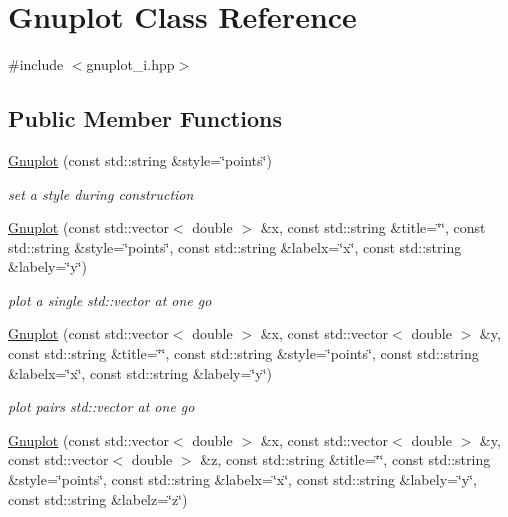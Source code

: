 \hypertarget{classGnuplot}{\section{\-Gnuplot \-Class \-Reference}
\label{classGnuplot}
}


{\ttfamily \#include $<$gnuplot\-\_\-i.\-hpp$>$}

\subsection*{\-Public \-Member \-Functions}
\begin{DoxyCompactItemize}
\item 
\hyperlink{classGnuplot_a187eb517b362cf379492fe7f1621ee50}{\-Gnuplot} (const std\-::string \&style=\char`\"{}points\char`\"{})
\begin{DoxyCompactList}\small\item\em set a style during construction \end{DoxyCompactList}\item 
\hyperlink{classGnuplot_a8ceac5808e42665c1dee305ae7ea9070}{\-Gnuplot} (const std\-::vector$<$ double $>$ \&x, const std\-::string \&title=\char`\"{}\char`\"{}, const std\-::string \&style=\char`\"{}points\char`\"{}, const std\-::string \&labelx=\char`\"{}x\char`\"{}, const std\-::string \&labely=\char`\"{}y\char`\"{})
\begin{DoxyCompactList}\small\item\em plot a single std\-::vector at one go \end{DoxyCompactList}\item 
\hyperlink{classGnuplot_a24327b6116c71acdc195eadf665c67cb}{\-Gnuplot} (const std\-::vector$<$ double $>$ \&x, const std\-::vector$<$ double $>$ \&y, const std\-::string \&title=\char`\"{}\char`\"{}, const std\-::string \&style=\char`\"{}points\char`\"{}, const std\-::string \&labelx=\char`\"{}x\char`\"{}, const std\-::string \&labely=\char`\"{}y\char`\"{})
\begin{DoxyCompactList}\small\item\em plot pairs std\-::vector at one go \end{DoxyCompactList}\item 
\hyperlink{classGnuplot_a14191e89154f2716608f6907975cc012}{\-Gnuplot} (const std\-::vector$<$ double $>$ \&x, const std\-::vector$<$ double $>$ \&y, const std\-::vector$<$ double $>$ \&z, const std\-::string \&title=\char`\"{}\char`\"{}, const std\-::string \&style=\char`\"{}points\char`\"{}, const std\-::string \&labelx=\char`\"{}x\char`\"{}, const std\-::string \&labely=\char`\"{}y\char`\"{}, const std\-::string \&labelz=\char`\"{}z\char`\"{})

\end{DoxyCompactItemize}
